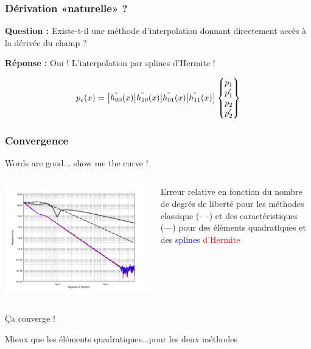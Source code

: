 \documentclass[10pt, compress]{beamer}
\begin{document}
\begin{frame}
	\frametitle{Dérivation «naturelle» ?}

	\textbf{Question :} Existe-t-il une méthode d'interpolation donnant \alert{directement accès} à la dérivée du champ
	?

	\pause
	\bigskip

	\textbf{Réponse :} Oui ! L'interpolation par \alert{splines d'Hermite} !

	\begin{equation*}
		p_e(x) = \left[\tilde{h_{00}}(x)\big|\tilde{h_{10}}(x)\big|\tilde{h_{01}}(x)\big|\tilde{h_{11}}(x)\right]\begin{Bmatrix}p_1\\p'_1\\p_2\\p'_2\end{Bmatrix}
	\end{equation*}
\end{frame}

\begin{frame}
	\frametitle{Convergence}
	\begin{block}{Words are good... show me the curve !}
		\begin{columns}[onlytextwidth]
		\begin{column}{0.6\textwidth}
			\includegraphics[width=\textwidth]{../report/part4/figs/herm_comp.png}
		\end{column}
		\begin{column}{0.4\textwidth}
            \footnotesize{Erreur relative en fonction du nombre de degrés de liberté pour les méthodes classique
            (-~-) et des caractéristiques (---) pour des éléments quadratiques et des \textcolor{blue}{splines}
            \textcolor{red}{d'Hermite}}
		\end{column}
		\end{columns}
	\end{block}

    \pause

    \begin{center}
        \alert{Ça converge !}

        \pause

        Mieux que les éléments quadratiques...\pause pour les deux méthodes
    \end{center}
\end{frame}
\end{document}

